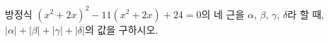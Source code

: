 방정식 $(x^2+2x)^2-11(x^2+2x)+24=0$의 네 근을 $\alpha$, $\beta$, $\gamma$, $\delta$라 할 때, $|\alpha|+|\beta|+|\gamma|+|\delta|$의 값을 구하시오.
